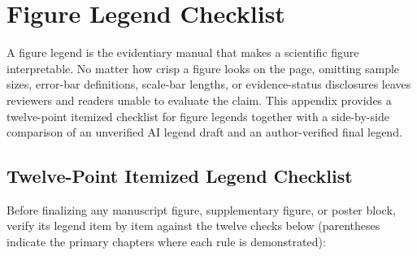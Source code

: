 \chapter{Figure Legend Checklist}
\label{app:legend-checklist}

A figure legend is the evidentiary manual that makes a scientific figure interpretable. No matter how crisp a figure looks on the page, omitting sample sizes, error-bar definitions, scale-bar lengths, or evidence-status disclosures leaves reviewers and readers unable to evaluate the claim. This appendix provides a twelve-point itemized checklist for figure legends together with a side-by-side comparison of an unverified AI legend draft and an author-verified final legend.

\section{Twelve-Point Itemized Legend Checklist}

Before finalizing any manuscript figure, supplementary figure, or poster block, verify its legend item by item against the twelve checks below (parentheses indicate the primary chapters where each rule is demonstrated):

